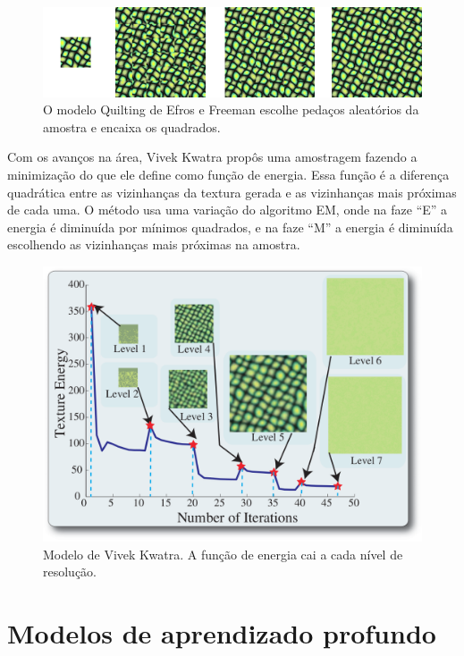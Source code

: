 \begin{figure}[!ht]
	\includegraphics[width=\linewidth]{files/assets/articles/efros2.png}
	\caption{O modelo Quilting de Efros e Freeman escolhe pedaços
	aleatórios da amostra e encaixa os quadrados.}
	\label{img:preview}
\end{figure}

Com os avanços na área,
Vivek Kwatra \cite{Kwatra2005} propôs
uma amostragem fazendo a minimização
do que ele define como função de energia. 
Essa função é a diferença quadrática
entre as vizinhanças da textura gerada
e as vizinhanças mais próximas de cada uma.
O método usa uma variação do algoritmo EM, 
onde na faze ``E'' a energia é diminuída
por mínimos quadrados, e na faze ``M'' a
energia é diminuída escolhendo as
vizinhanças mais próximas na amostra.

\begin{figure}[!ht]
	\centering
	\includegraphics[width=\linewidth*2/3]{files/assets/articles/kwatra.png}
	\caption{Modelo de Vivek Kwatra. A função de energia 
	cai a cada nível de resolução.}
	\label{img:preview}
\end{figure}


\section{Modelos de aprendizado profundo}

